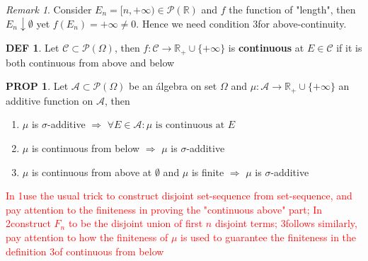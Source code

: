 \documentclass[hidelinks]{article}
\theoremstyle{definition}
\newtheorem*{defin}{DEF}
\theoremstyle{dotless}
\newtheorem{proposition}{PROP}[section]
\theoremstyle{remark}
\newtheorem*{remark}{Remark}
\begin{document}
\begin{remark}
Consider $E_n=[n,+\infty)\in\mathscr{P}(\mathbb{R})$ and $f$ the function of "length", then $E_n\downarrow\emptyset$ yet $f(E_n)=+\infty\neq0$. Hence we need condition 3\degree for above-continuity.
\end{remark}

\begin{defin}
Let $\mathscr{C}\subset\mathscr{P}(\Omega)$, then $f:\mathscr{C}\to\mathbb{R}_+\cup\{+\infty\}$ is \textbf{continuous} at $E\in\mathscr{C}$ if it is both continuous from above and below
\end{defin}

\begin{proposition}
Let $\mathscr{A}\subset\mathscr{P}(\Omega)$ be an álgebra on set $\Omega$ and $\mu:\mathscr{A}\to\mathbb{R}_+\cup\{+\infty\}$ an additive function on $\mathscr{A}$, then \begin{enumerate}[label=\arabic*\degree]
    \item $\mu$ is $\sigma$-additive $\Rightarrow$ $\forall E\in\mathscr{A}:\mu\textrm{ is continuous at }E$
    \item $\mu$ is continuous from below $\Rightarrow$ $\mu$ is $\sigma$-additive
    \item $\mu$ is continuous from above at $\emptyset$ and $\mu$ is finite $\Rightarrow$ $\mu$ is $\sigma$-additive
\end{enumerate}
\end{proposition}
\textcolor{red}{In 1\degree  use the usual trick to construct disjoint set-sequence from set-sequence, and pay attention to the finiteness in proving the "continuous above" part; In 2\degree construct $F_n$ to be the disjoint union of first $n$ disjoint terms; 3\degree follows similarly, pay attention to how the finiteness of $\mu$ is used to guarantee the finiteness in the definition 3\degree of continuous from below}
\end{document}
